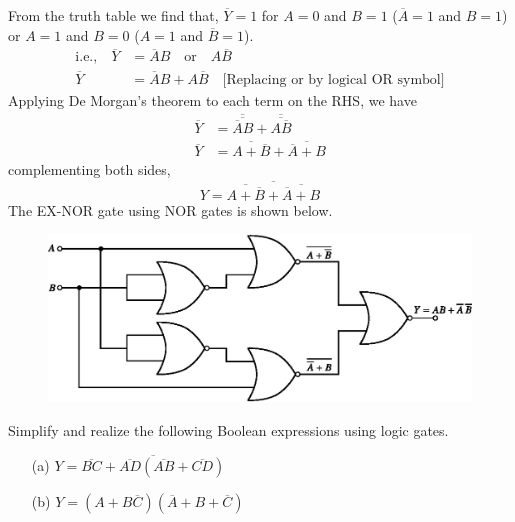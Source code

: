 \begin{solution}
\begin{itemize}
From the truth table we find that, $\overline{Y}=1$ for $A=0$ and
$B=1$ ($\overline{A}=1$ and $B=1$) or $A=1$ and $B=0$ ($A=1$ and
$\overline{B}=1$).
\begin{align*}
\text{i.e.,}\quad \overline{Y} &= \overline{A}B\quad\text{or}\quad
A\overline{B}\\[3pt]
\overline{Y} &= \overline{A}B+A\overline{B}\quad \text{[Replacing or
    by logical OR symbol]} 
\end{align*}
Applying De Morgan's theorem to each term on the RHS, we have
\begin{align*}
\overline{Y}
&=\overline{\overline{\overline{A}B}}+\overline{\overline{A\overline{B}}}\\[3pt]
\overline{Y} &= \overline{A+\overline{B}}+\overline{\overline{A}+B}
\end{align*}
complementing both sides,
$$
Y=\overline{\overline{A+\overline{B}}+\overline{\overline{A}+B}}
$$
The EX-NOR gate using NOR gates is shown below.
\begin{figure}[H]
\centering
\includegraphics{chap6/fig109.eps}
\end{figure}
\end{itemize}
\vskip -1cm
\end{solution}

\smallskip
\begin{example}\label{exam6.29}
Simplify and realize the following Boolean expressions using logic gates.
\begin{itemize}
\item[(a)] $Y=\overline{\overline{BC}+\overline{AD}(\overline{AB}+\overline{CD})}$

\item[(b)] $Y=(A+B\overline{C})(\overline{A}+B+\overline{C})$
\end{itemize}
\end{example}

